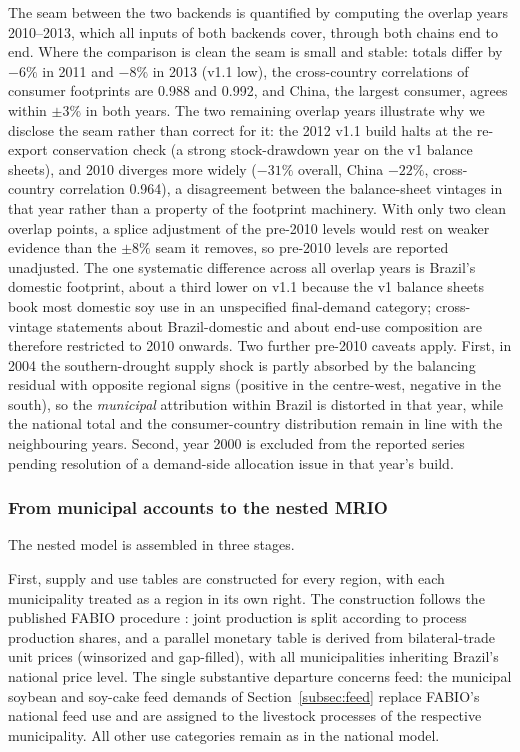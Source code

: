 The seam between the two backends is quantified by computing the overlap
years 2010--2013, which all inputs of both backends cover, through both
chains end to end. Where the comparison is clean the seam is small and
stable: totals differ by $-6\%$ in 2011 and $-8\%$ in 2013 (v1.1 low), the
cross-country correlations of consumer footprints are 0.988 and 0.992, and
China, the largest consumer, agrees within $\pm3\%$ in both years. The two
remaining overlap years illustrate why we disclose the seam rather than
correct for it: the 2012 v1.1 build halts at the re-export conservation
check (a strong stock-drawdown year on the v1 balance sheets), and 2010
diverges more widely ($-31\%$ overall, China $-22\%$, cross-country
correlation 0.964), a disagreement between the balance-sheet vintages in
that year rather than a property of the footprint machinery. With only two
clean overlap points, a splice adjustment of the pre-2010 levels would rest
on weaker evidence than the $\pm$$8\%$ seam it removes, so pre-2010 levels
are reported unadjusted. The one systematic difference across all overlap
years is Brazil's domestic footprint, about a third lower on v1.1
because the v1 balance sheets book most domestic soy use in an unspecified
final-demand category; cross-vintage statements about Brazil-domestic and
about end-use composition are therefore restricted to 2010 onwards. Two
further pre-2010 caveats apply. First, in 2004 the southern-drought supply
shock is partly absorbed by the balancing residual with opposite regional
signs (positive in the centre-west, negative in the south), so the
\emph{municipal} attribution within Brazil is distorted in that year, while
the national total and the consumer-country distribution remain in line with
the neighbouring years. Second, year 2000 is excluded from the reported
series pending resolution of a demand-side allocation issue in that year's
build.

\subsubsection{From municipal accounts to the nested MRIO}
\label{subsubsec:supplyuse}\label{subsubsec:mrsut}\label{subsubsec:leontief}\label{subsubsec:hybrid}
The nested model is assembled in three stages.

First, supply and use tables are constructed for every region, with each
municipality treated as a region in its own right. The construction follows
the published FABIO procedure \cite{bruckner2019fabio}: joint production is
split according to process production shares, and a parallel monetary table
is derived from bilateral-trade unit prices (winsorized and gap-filled),
with all municipalities inheriting Brazil's national price level. The single
substantive departure concerns feed: the municipal soybean and soy-cake feed
demands of Section~\ref{subsec:feed} replace FABIO's national feed use and
are assigned to the livestock processes of the respective municipality. All
other use categories remain as in the national model.

